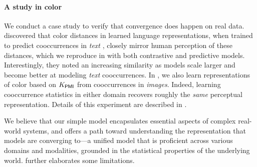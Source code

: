 \documentclass{article}
\theoremstyle{plain}
\theoremstyle{definition}
\theoremstyle{remark}
\begin{document}




\paragraph{A study in color}
We conduct a case study to verify that convergence does happen on real data.
\citet{abdou2021can} discovered that color distances in learned language representations, when trained to predict cooccurrences in \emph{text} \citep{devlin2018bert}, closely mirror human perception of these distances, which we reproduce in  with both contrastive and predictive models. Interestingly, they noted an increasing similarity as models scale larger and become better at modeling \emph{text} cooccurrences. In , we also learn representations of color based on $K_\mathsf{PMI}$ from cooccurrences in \emph{images}. %
Indeed, learning cooccurrence statistics in either domain recovers roughly the \emph{same} perceptual representation. Details of this experiment are described in . 

We believe that our simple model encapsulates essential aspects of complex real-world systems, and offers a path toward understanding the representation that models are converging to---a unified model that is proficient across various domains and modalities, grounded in the statistical properties of the underlying world.  further elaborates some limitations.





\end{document}
